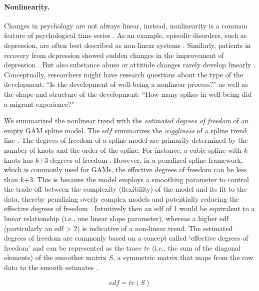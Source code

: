 \paragraph{Nonlinearity.}

Changes in psychology are not always linear, instead, nonlinearity is a
common feature of psychological time series \citep{hayes2007}. As an
example, episodic disorders, such as depression, are often best
described as non-linear systems \citep{hosenfeld2015}. Similarly,
patients in recovery from depression showed sudden changes in the
improvement of depression \citep{helmich2020a}. But also substance abuse
\citep{boker1998} or attitude changes rarely develop linearly
\citep{vandermaas2003}. Conceptually, researchers might have research
questions about the type of the development: ``Is the development of
well-being a nonlinear process?'' as well as the shape and structure of
the development: ``How many spikes in well-being did a migrant
experience?''

We summarized the nonlinear trend with the
\textit{estimated degrees of freedom} of an empty GAM spline model. The
\(edf\) summarizes the \textit{wiggliness} of a spline trend line
\citep{wood2017, bringmann2017}. The degrees of freedom of a spline
model are primarily determined by the number of knots and the order of
the spline. For instance, a cubic spline with \(k\) knots has \(k\)+3
degrees of freedom
\citep{faraway2016, haslbeck2021a, castro-alvarez2024}. However, in a
penalized spline framework, which is commonly used for GAMs, the
effective degrees of freedom can be less than \(k\)+3. This is because
the model employs a smoothing parameter to control the trade-off between
the complexity (flexibility) of the model and its fit to the data,
thereby penalizing overly complex models and potentially reducing the
effective degrees of freedom \citep{marx1998}. Intuitively then an edf
of 1 would be equivalent to a linear relationship (i.e., one linear
slope parameter), whereas a higher edf (particularly an edf
\textgreater{} 2) is indicative of a non-linear trend. The estimated
degrees of freedom are commonly based on a concept called `effective
degrees of freedom' and can be represented as the trace \(tr\) (i.e.,
the sum of the diagonal elements) of the smoother matrix \(S\), a
symmetric matrix that maps from the raw data to the smooth estimates
\citep{wood2017}.

\begin{equation} \label{eq:df}
  edf = tr(S)
\end{equation}

